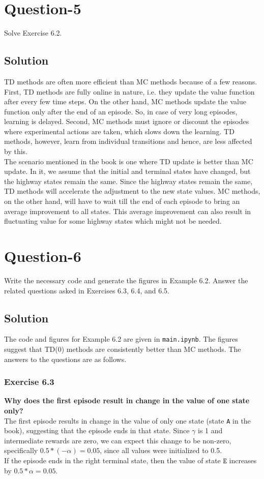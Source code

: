 \documentclass[11pt]{article}
\begin{document}
    \section*{Question-5}
    Solve Exercise 6.2.

    \subsection*{Solution}
    TD methods are often more efficient than MC methods because of a few reasons. First, TD methods are fully online
    in nature, i.e. they update the value function after every few time steps. On the other hand, MC methods update
    the value function only after the end of an episode. So, in case of very long episodes, learning is delayed.
    Second, MC methods must ignore or discount the episodes where experimental actions are taken, which slows down
    the learning. TD methods, however, learn from individual transitions and hence, are less affected by this. \\
    The scenario mentioned in the book is one where TD update is better than MC update. In it, we assume that the
    initial and terminal states have changed, but the highway states remain the same. Since the highway states remain
    the same, TD methods will accelerate the adjustment to the new state values. MC methods, on the other hand, will
    have to wait till the end of each episode to bring an average improvement to all states. This average improvement
    can also result in fluctuating value for some highway states which might not be needed.

    \section*{Question-6}
    Write the necessary code and generate the figures in Example 6.2. Answer the related questions
    asked in Exercises 6.3, 6.4, and 6.5.

    \subsection*{Solution}
    The code and figures for Example 6.2 are given in \texttt{main.ipynb}. The figures suggest that
    TD(0) methods are consistently better than MC methods. The answers to the questions are as follows.

    \subsubsection*{Exercise 6.3}
    \textbf{Why does the first episode result in change in the value of one state only?} \\[5pt]
    The first episode results in change in the value of only one state (state \texttt{A} in the book), suggesting
    that the episode ends in that state. Since $\gamma$ is 1 and intermediate rewards are zero, we can
    expect this change to be non-zero, specifically $0.5 * (-\alpha) = 0.05$, since all values were
    initialized to 0.5. \\
    If the episode ends in the right terminal state, then the value of state $\texttt{E}$ increases by
    $0.5 * \alpha = 0.05$.
\end{document}
